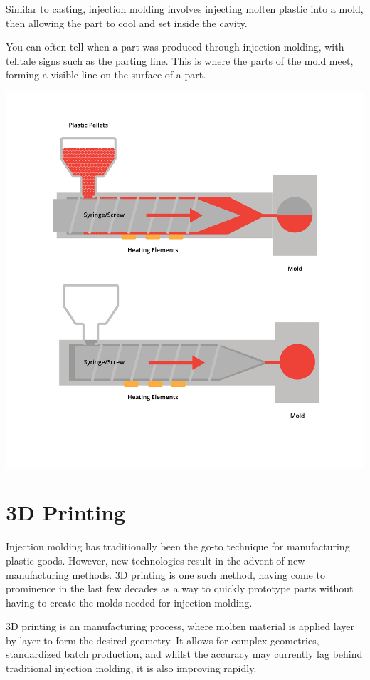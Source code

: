 Similar to casting, injection molding involves injecting molten plastic into a mold, then allowing the part to cool and set inside the cavity. 

You can often tell when a part was produced through injection molding, with telltale signs such as the parting line. This is where the parts of the mold meet, forming a visible line on the surface of a part.
\begin{center}
    
    \includegraphics[width=.75\textwidth]{injectionMolding.png}
\end{center}



\section{3D Printing}

Injection molding has traditionally been the go-to technique for manufacturing plastic goods. However, new technologies result in the advent of new manufacturing methods. 3D printing is one such method, having come to prominence in the last few decades as a way to quickly prototype parts without having to create the molds needed for injection molding.

3D printing is an  manufacturing process, where molten material is applied layer by layer to form the desired geometry. It allows for complex geometries, standardized batch production, and whilst the accuracy may currently lag behind traditional injection molding, it is also improving rapidly.

